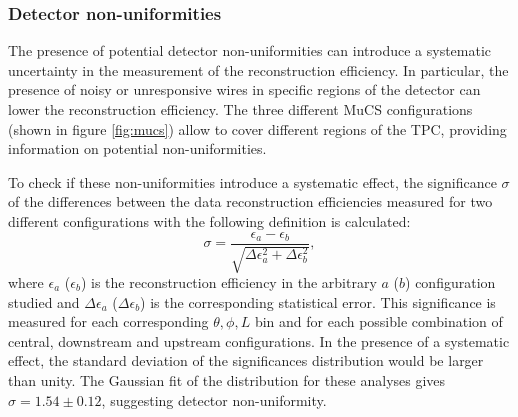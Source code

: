 \documentclass[a4paper,11pt]{article}
\begin{document}
\subsubsection{Detector non-uniformities}\label{sec:wires}
The presence of potential detector non-uniformities can introduce a systematic uncertainty in the measurement of the reconstruction efficiency. In particular, the presence of noisy or unresponsive wires in specific regions of the detector can lower the reconstruction efficiency. The three different MuCS configurations (shown in figure \ref{fig:mucs}) allow to cover different regions of the TPC, providing information on potential non-uniformities.

To check if these non-uniformities introduce a systematic effect, the significance $\sigma$ of the differences between the data reconstruction efficiencies measured for two different configurations with the following definition is calculated:
\begin{equation}
\sigma = \frac{\epsilon_a-\epsilon_b}{\sqrt{\Delta \epsilon_{a}^2 + \Delta \epsilon_b^2}},
\end{equation}
where $\epsilon_{a}$ ($\epsilon_{b}$) is the reconstruction efficiency in the arbitrary $a$ ($b$) configuration studied and $\Delta \epsilon_{a}$ ($\Delta \epsilon_{b}$) is the corresponding statistical error. This significance is measured for each corresponding $\theta,\phi,L$ bin and for each possible combination of central, downstream and upstream configurations. In the presence of a systematic effect, the standard deviation of the significances distribution would be larger than unity. The Gaussian fit of the distribution for these analyses gives $\sigma = 1.54\pm0.12$, suggesting detector non-uniformity.


\end{document}
